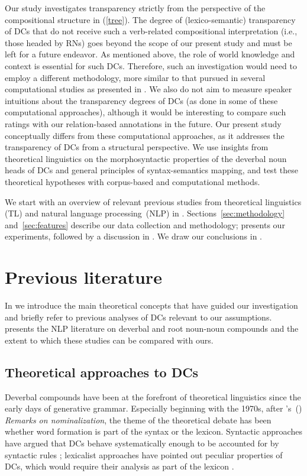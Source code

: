 \documentclass[output=paper]{langsci/langscibook}
\begin{document}
 Our study investigates transparency strictly from the perspective of the compositional structure in  (\ref{tree}). The degree of (lexico-semantic) transparency of DCs that do not receive such a verb-related compositional interpretation (i.e., those headed by RNs) goes beyond the scope of our present study and must be left for a future endeavor. As mentioned above, the role of world knowledge and context is essential for such DCs. Therefore, such an investigation would need to employ a different methodology, more similar to that pursued in several computational studies as presented in . We also do not aim to measure speaker intuitions about the transparency degrees of DCs (as done in some of these computational approaches), although it would be interesting to compare such ratings with our relation-based annotations  in the future. Our present study conceptually differs from these computational approaches, as it addresses the transparency of DCs from a structural perspective. We use insights from theoretical linguistics on the morphosyntactic properties of the deverbal noun heads of DCs and general principles of syntax-semantics mapping, and test these theoretical hypotheses  with corpus-based and computational methods.

We start with an overview of relevant  {previous studies from theoretical linguistics (TL)} and  {natural language processing~(NLP)} in .
Sections~\ref{sec:methodology} and~\ref{sec:features} describe our data collection and methodology;  presents our experiments, followed by a discussion in . We draw our conclusions in .

\section{Previous literature}\label{sec:previous:lit}
In  we introduce the main theoretical concepts  that have guided our investigation and briefly refer to previous analyses of DCs relevant to our assumptions.  presents the  {NLP} literature on  {deverbal and root} noun-noun compounds and the extent to which these studies can be compared with ours.

\subsection{Theoretical approaches to DCs}\label{sec:theoretical:lit}
Deverbal compounds have been at the forefront of theoretical linguistics since the early days of generative grammar. Especially beginning with the 1970s, after \citeauthor{chomsky:70}'s~(\citeyear{chomsky:70}) \textit{Remarks on nominalization}, the theme of the theoretical debate has been whether word formation is part of the syntax or the lexicon. Syntactic approaches have argued that DCs behave systematically enough to be accounted for by syntactic rules \citep{roeper:siegel:78,ackema:neeleman:04}; lexicalist approaches have pointed out peculiar properties of DCs, which would require their analysis as part of the lexicon \citep{selkirk:82,lieber:04}. 
\end{document}
